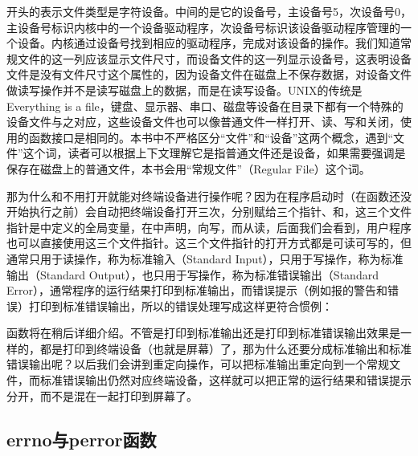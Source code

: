 开头的表示文件类型是字符设备。中间的是它的设备号，主设备号5，次设备号0，主设备号标识内核中的一个设备驱动程序，次设备号标识该设备驱动程序管理的一个设备。内核通过设备号找到相应的驱动程序，完成对该设备的操作。我们知道常规文件的这一列应该显示文件尺寸，而设备文件的这一列显示设备号，这表明设备文件是没有文件尺寸这个属性的，因为设备文件在磁盘上不保存数据，对设备文件做读写操作并不是读写磁盘上的数据，而是在读写设备。UNIX的传统是Everything is a file，键盘、显示器、串口、磁盘等设备在目录下都有一个特殊的设备文件与之对应，这些设备文件也可以像普通文件一样打开、读、写和关闭，使用的函数接口是相同的。本书中不严格区分“文件”和“设备”这两个概念，遇到“文件”这个词，读者可以根据上下文理解它是指普通文件还是设备，如果需要强调是保存在磁盘上的普通文件，本书会用“常规文件”（Regular File）这个词。



那为什么和不用打开就能对终端设备进行操作呢？因为在程序启动时（在函数还没开始执行之前）会自动把终端设备打开三次，分别赋给三个指针、和，这三个文件指针是中定义的全局变量，在中声明，向写，而从读，后面我们会看到，用户程序也可以直接使用这三个文件指针。这三个文件指针的打开方式都是可读可写的，但通常只用于读操作，称为标准输入（Standard Input），只用于写操作，称为标准输出（Standard Output），也只用于写操作，称为标准错误输出（Standard Error），通常程序的运行结果打印到标准输出，而错误提示（例如报的警告和错误）打印到标准错误输出，所以的错误处理写成这样更符合惯例：




函数将在稍后详细介绍。不管是打印到标准输出还是打印到标准错误输出效果是一样的，都是打印到终端设备（也就是屏幕）了，那为什么还要分成标准输出和标准错误输出呢？以后我们会讲到重定向操作，可以把标准输出重定向到一个常规文件，而标准错误输出仍然对应终端设备，这样就可以把正常的运行结果和错误提示分开，而不是混在一起打印到屏幕了。


\subsection{errno与perror函数}
%


